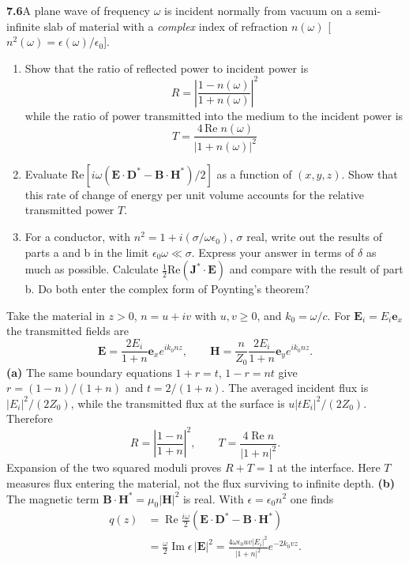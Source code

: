 \par\bigskip
\noindent\textbf{7.6}\quad A plane wave of frequency $\omega$ is incident normally from vacuum on a semi-infinite slab of material with a \emph{complex} index of refraction $n(\omega)$ [$n^{2}(\omega)=\epsilon(\omega)/\epsilon_{0}$].
\begin{enumerate}
\item[(a)] Show that the ratio of reflected power to incident power is
\[
R=\left|\frac{1-n(\omega)}{1+n(\omega)}\right|^{2}
\]
while the ratio of power transmitted into the medium to the incident power is
\[
T=\frac{4\,\mathrm{Re}\;n(\omega)}{|1+n(\omega)|^{2}}
\]
\item[(b)] Evaluate $\mathrm{Re}[i\omega(\mathbf{E}\cdot\mathbf{D}^{*}-\mathbf{B}\cdot\mathbf{H}^{*})/2]$ as a function of $(x,y,z)$. Show that this rate of change of energy per unit volume accounts for the relative transmitted power $T$.
\item[(c)] For a conductor, with $n^{2}=1+i(\sigma/\omega\epsilon_{0})$, $\sigma$ real, write out the results of parts a and b in the limit $\epsilon_{0}\omega\ll\sigma$. Express your answer in terms of $\delta$ as much as possible. Calculate $\frac{1}{2}\mathrm{Re}(\mathbf{J}^{*}\cdot\mathbf{E})$ and compare with the result of part b. Do both enter the complex form of Poynting's theorem?
\end{enumerate}
\solution
Take the material in $z>0$, $n=u+iv$ with $u,v\geq0$, and
$k_0=\omega/c$. For $\mathbf E_i=E_i\mathbf e_x$ the transmitted
fields are
\[
\mathbf E=\frac{2E_i}{1+n}\mathbf e_x e^{ik_0nz},\qquad
\mathbf H=\frac n{Z_0}\frac{2E_i}{1+n}\mathbf e_y e^{ik_0nz}.
\]
\textbf{(a)} The same boundary equations $1+r=t$, $1-r=nt$
give $r=(1-n)/(1+n)$ and $t=2/(1+n)$. The averaged incident
flux is $|E_i|^2/(2Z_0)$, while the transmitted flux at the surface
is $u|tE_i|^2/(2Z_0)$. Therefore
\[
\boxed{R=\left|\frac{1-n}{1+n}\right|^2,\qquad
T=\frac{4\operatorname{Re}n}{|1+n|^2}.}
\]
Expansion of the two squared moduli proves $R+T=1$ at the interface.
Here $T$ measures flux entering the material, not the flux surviving
to infinite depth.
\textbf{(b)} The magnetic term $\mathbf B\cdot\mathbf H^*
=\mu_0|\mathbf H|^2$ is real. With
$\epsilon=\epsilon_0n^2$ one finds
\begin{align*}
q(z)&=\operatorname{Re}\frac{i\omega}{2}
       (\mathbf E\cdot\mathbf D^*-\mathbf B\cdot\mathbf H^*)\\
&=\frac\omega2\operatorname{Im}\epsilon\,|\mathbf E|^2
=\boxed{\frac{4\omega\epsilon_0uv|E_i|^2}{|1+n|^2}
                              e^{-2k_0vz}}.
\end{align*}
